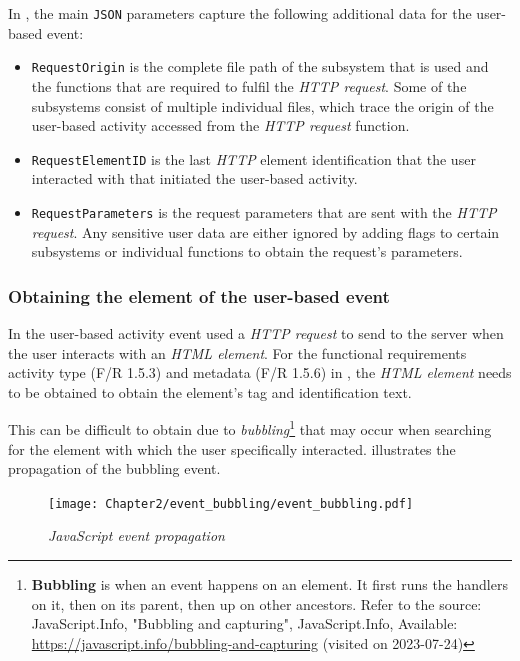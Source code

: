 In , the main \texttt{JSON} parameters capture the following additional data for the user-based event:

\begin{itemize}
	\item \texttt{RequestOrigin} is the complete file path of the subsystem that is used and the functions that are required to fulfil the \textit{HTTP request}. Some of the subsystems consist of multiple individual files, which trace the origin of the user-based activity accessed from the \textit{HTTP request} function.
	\item \texttt{RequestElementID} is the last \textit{HTTP} element identification that the user interacted with that initiated the user-based activity.
	\item \texttt{RequestParameters} is the request parameters that are sent with the \textit{HTTP request}. Any sensitive user data are either ignored by adding flags to certain subsystems or individual functions to obtain the request's parameters.
\end{itemize}

\subsubsection{Obtaining the element of the user-based event}\label{sec:ch3_ElementObtaining}
In  the user-based activity event used a \textit{HTTP request} to send to the server when the user interacts with an \textit{HTML element}. For the functional requirements activity type (F/R 1.5.3) and metadata (F/R 1.5.6) in , the \textit{HTML element} needs to be obtained to obtain the element's tag and identification text.\par This can be difficult to obtain due to \textit{bubbling}\footnote{\textbf{Bubbling} is when an event happens on an element. It first runs the handlers on it, then on its parent, then up on other ancestors. Refer to the source: JavaScript.Info, "Bubbling and capturing", JavaScript.Info, Available: \url{https://javascript.info/bubbling-and-capturing} (visited on 2023-07-24)} that may occur when searching for the element with which the user specifically interacted.  illustrates the propagation of the bubbling event.

\begin{figure}[!htb]
	\centering %
	\texttt{[image: Chapter2/event\_bubbling/event\_bubbling.pdf]}
	\caption[JavaScript event propagation]
	{\textit{JavaScript event propagation}}\label{fig:ch2_event_bubbling}
\end{figure}

